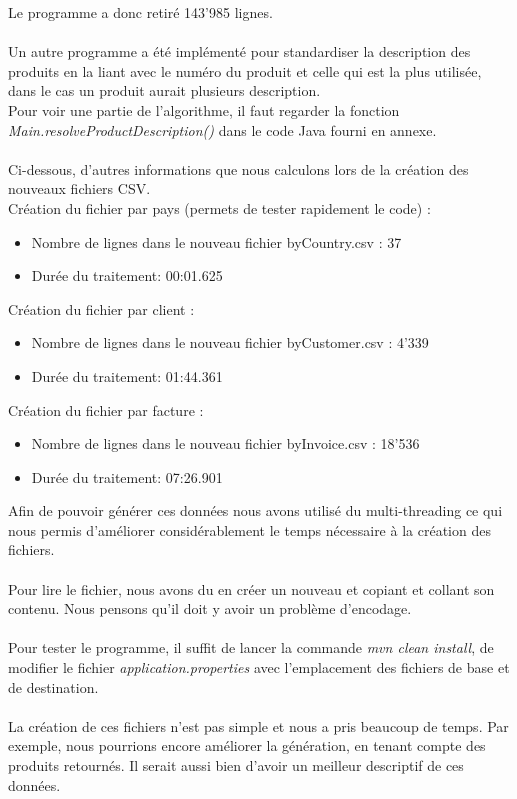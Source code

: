 \documentclass[a4paper]{article}
\begin{document}
Le programme a donc retiré 143'985 lignes.
\\\\
Un autre programme a été implémenté pour standardiser la description des produits en la liant avec le numéro du produit et celle qui est la plus utilisée, dans le cas un produit aurait plusieurs description. \\
Pour voir une partie de l'algorithme, il faut regarder la fonction \textit{Main.resolveProductDescription()} dans le code Java fourni en annexe.
\\\\
Ci-dessous, d'autres informations que nous calculons lors de la création des nouveaux fichiers CSV.
\\
Création du fichier par pays (permets de tester rapidement le code) :
\begin{itemize}
	\item Nombre de lignes dans le nouveau fichier byCountry.csv : 37
	\item Durée du traitement: 00:01.625
\end{itemize}
\vspace{6pt}

Création du fichier par client :
\begin{itemize}
	\item Nombre de lignes dans le nouveau fichier byCustomer.csv : 4'339
	\item Durée du traitement: 01:44.361
\end{itemize}

\vspace{6pt}

Création du fichier par facture :
\begin{itemize}
	\item Nombre de lignes dans le nouveau fichier byInvoice.csv : 18'536
	\item Durée du traitement: 07:26.901
\end{itemize}

\vspace{6pt}

Afin de pouvoir générer ces données nous avons utilisé du multi-threading ce qui nous permis d'améliorer considérablement le temps nécessaire à la création des fichiers.
\\\\
Pour lire le fichier, nous avons du en créer un nouveau et copiant et collant son contenu. Nous pensons qu'il doit y avoir un problème d'encodage. 
\\\\
Pour tester le programme, il suffit de lancer la commande \textit{mvn clean install}, de modifier le fichier \textit{application.properties} avec l'emplacement des fichiers de base et de destination.
\\\\
La création de ces fichiers n'est pas simple et nous a pris beaucoup de temps. Par exemple, nous pourrions encore améliorer la génération, en tenant compte des produits retournés.
Il serait aussi bien d'avoir un meilleur descriptif de ces données.
\end{document}
